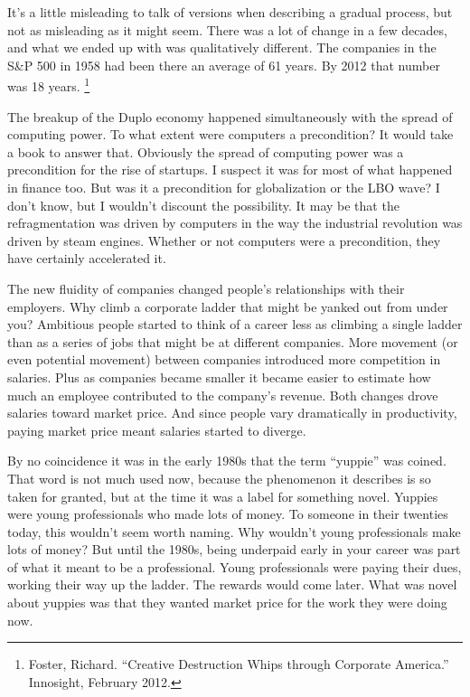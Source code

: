\documentclass[12pt]{book}
\begin{document}
It's a little misleading to talk of versions when describing a gradual
process, but not as misleading as it might seem. There was a lot of
change in a few decades, and what we ended up with was qualitatively
different. The companies in the S\&P 500 in 1958 had been there an
average of 61 years. By 2012 that number was 18 years.
\footnote{Foster, Richard. ``Creative Destruction Whips through Corporate
America.'' Innosight, February 2012.}

The breakup of the Duplo economy happened simultaneously with the spread
of computing power. To what extent were computers a precondition? It
would take a book to answer that. Obviously the spread of computing
power was a precondition for the rise of startups. I suspect it was for
most of what happened in finance too. But was it a precondition for
globalization or the LBO wave? I don't know, but I wouldn't discount the
possibility. It may be that the refragmentation was driven by computers
in the way the industrial revolution was driven by steam engines.
Whether or not computers were a precondition, they have certainly
accelerated it.

The new fluidity of companies changed people's relationships with their
employers. Why climb a corporate ladder that might be yanked out from
under you? Ambitious people started to think of a career less as
climbing a single ladder than as a series of jobs that might be at
different companies. More movement (or even potential movement) between
companies introduced more competition in salaries. Plus as companies
became smaller it became easier to estimate how much an employee
contributed to the company's revenue. Both changes drove salaries toward
market price. And since people vary dramatically in productivity, paying
market price meant salaries started to diverge.

By no coincidence it was in the early 1980s that the term ``yuppie'' was
coined. That word is not much used now, because the phenomenon it
describes is so taken for granted, but at the time it was a label for
something novel. Yuppies were young professionals who made lots of
money. To someone in their twenties today, this wouldn't seem worth
naming. Why wouldn't young professionals make lots of money? But until
the 1980s, being underpaid early in your career was part of what it
meant to be a professional. Young professionals were paying their dues,
working their way up the ladder. The rewards would come later. What was
novel about yuppies was that they wanted market price for the work they
were doing now.
\end{document}
